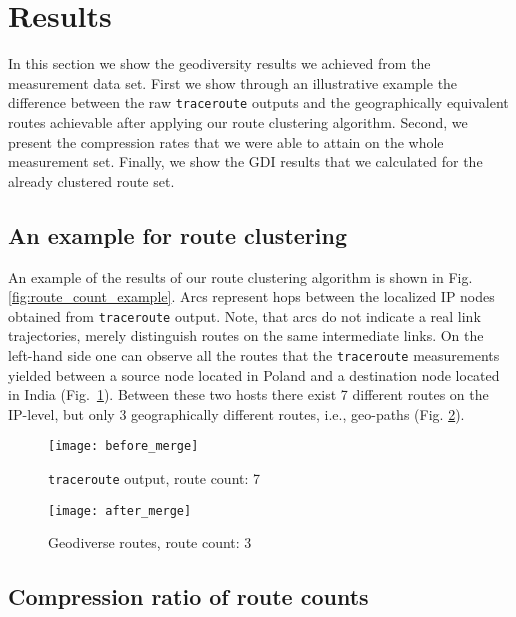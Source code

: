 \documentclass[peerreview]{IEEEtran}
\begin{document}
\section{Results}
\label{sec:results}

In this section we show the geodiversity results we achieved from the
measurement data set. First we show through an illustrative example the
difference between the raw \texttt{traceroute} outputs and the geographically
equivalent routes achievable after applying our route clustering algorithm.
Second, we present the compression rates that we were able to attain on the
whole measurement set. Finally, we show the GDI results that we calculated for
the already clustered route set.

\subsection{An example for route clustering}

An example of the results of our route clustering algorithm is shown in Fig.
\ref{fig:route_count_example}. Arcs represent hops between the localized IP
nodes obtained from \texttt{traceroute} output. Note, that arcs do not indicate
a real link trajectories, merely distinguish routes on the same intermediate
links. On the left-hand side one can observe all the routes that the
\texttt{traceroute} measurements yielded between a source node located in Poland
and a destination node located in India (Fig.~\ref{fig:before-merge}). Between
these two hosts there exist 7 different routes on the IP-level, but only 3
geographically different routes, i.e., geo-paths (Fig. \ref{fig:after-merge}).

\begin{figure*}
\centering
\begin{subfigure}[t]{.49\columnwidth}
\texttt{[image: before\_merge]}
\caption{\texttt{traceroute} output, route count: 7}
\label{fig:before-merge}
\end{subfigure}
\begin{subfigure}[t]{.49\columnwidth}
\texttt{[image: after\_merge]}
\caption{Geodiverse routes, route count: 3}\label{fig:after-merge}
\end{subfigure}
\caption{Route count comparison}
\label{fig:route_count_example}
\end{figure*}

\subsection{Compression ratio of route counts}
\end{document}
